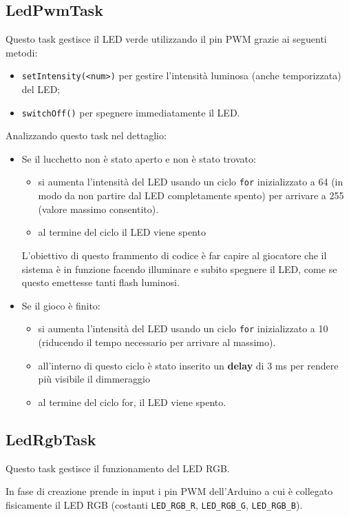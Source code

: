 \subsection{LedPwmTask}
Questo task gestisce il LED verde utilizzando il pin PWM grazie ai seguenti metodi:
\begin{itemize}
	\item \texttt{setIntensity(<num>)} per gestire l'intensità luminosa (anche temporizzata) del LED;
	\item \texttt{switchOff()} per spegnere immediatamente il LED.
\end{itemize}
Analizzando questo task nel dettaglio:
\begin{itemize}
	\item Se il lucchetto non è stato aperto e non è stato trovato:
	\begin{itemize}
		\item si aumenta l'intensità del LED usando un ciclo \texttt{for} inizializzato a 64 (in modo da non partire dal LED completamente spento) per arrivare a 255 (valore massimo consentito).
		\item al termine del ciclo il LED viene spento
	\end{itemize}
	L'obiettivo di questo frammento di codice è far capire al giocatore che il sistema è in funzione facendo illuminare e subito spegnere il LED, come se questo emettesse tanti flash luminosi.
	\item Se il gioco è finito:
	\begin{itemize}
		\item si aumenta l'intensità del LED usando un ciclo \texttt{for} inizializzato a 10 (riducendo il tempo necessario per arrivare al massimo).
		\item all'interno di questo ciclo è stato inserito un \textbf{delay} di 3 ms per rendere più visibile il dimmeraggio
		\item al termine del ciclo for, il LED viene spento.
	\end{itemize}
\end{itemize}

\subsection{LedRgbTask}
Questo task gestisce il funzionamento del LED RGB.

In fase di creazione prende in input i pin PWM dell'Arduino a cui è collegato fisicamente il LED RGB (costanti \texttt{LED\_RGB\_R}, \texttt{LED\_RGB\_G}, \texttt{LED\_RGB\_B}).

